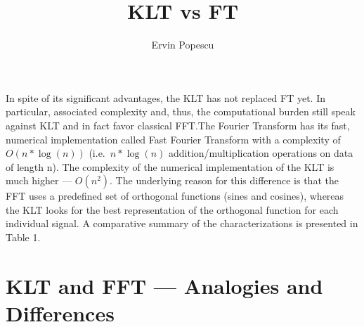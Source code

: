 \documentclass[12pt, a4paper, twoside, english]{article}
\author{Ervin Popescu}
\title{KLT vs FT}
\begin{document}
\maketitle
In spite of its significant advantages, the KLT has not replaced FT yet. In particular, associated complexity and, thus, the computational burden still speak against KLT and in fact favor classical FFT.\@ The Fourier Transform has its fast, numerical implementation called Fast Fourier Transform with a complexity of \(O(n*\log(n))\) (i.e.\ \(n*\log(n)\) addition/multiplication operations on data of length n).
The complexity of the numerical implementation of the KLT is much higher — \(O(n^2)\).
The underlying reason for this difference is that the FFT uses a predefined set of orthogonal functions (sines and cosines), 
whereas the KLT looks for the best representation of the orthogonal function for each individual signal. A comparative summary of the characterizations is presented in Table 1.
\section*{KLT and FFT — Analogies and Differences}
\end{document}
